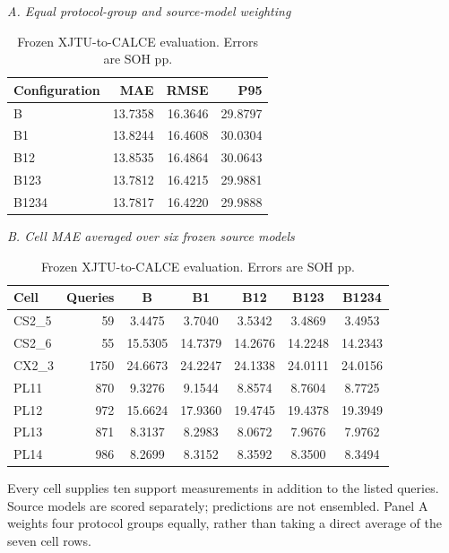 \begin{table}[!p]\renewcommand{\arraystretch}{1.15}\centering
\caption{Frozen XJTU-to-CALCE evaluation. Errors are SOH pp.}\label{tab:calcemain}
\papertablesize\setlength{\tabcolsep}{3pt}
\textit{A. Equal protocol-group and source-model weighting}\\[4pt]
\begin{tabular}{lrrr}
\toprule
Configuration & MAE & RMSE & P95 \\
\midrule
B & 13.7358 & 16.3646 & 29.8797 \\
B1 & 13.8244 & 16.4608 & 30.0304 \\
B12 & 13.8535 & 16.4864 & 30.0643 \\
B123 & 13.7812 & 16.4215 & 29.9881 \\
B1234 & 13.7817 & 16.4220 & 29.9888 \\
\bottomrule
\end{tabular}
\par\medskip
\textit{B. Cell MAE averaged over six frozen source models}\\[4pt]
\begin{tabular}{lrccccc}
\toprule
Cell & Queries & B & B1 & B12 & B123 & B1234 \\
\midrule
CS2\_5 & 59 & 3.4475 & 3.7040 & 3.5342 & 3.4869 & 3.4953 \\
CS2\_6 & 55 & 15.5305 & 14.7379 & 14.2676 & 14.2248 & 14.2343 \\
CX2\_3 & 1750 & 24.6673 & 24.2247 & 24.1338 & 24.0111 & 24.0156 \\
PL11 & 870 & 9.3276 & 9.1544 & 8.8574 & 8.7604 & 8.7725 \\
PL12 & 972 & 15.6624 & 17.9360 & 19.4745 & 19.4378 & 19.3949 \\
PL13 & 871 & 8.3137 & 8.2983 & 8.0672 & 7.9676 & 7.9762 \\
PL14 & 986 & 8.2699 & 8.3152 & 8.3592 & 8.3500 & 8.3494 \\
\bottomrule
\end{tabular}
\par\smallskip\begin{minipage}{\columnwidth}\papertablesize Every cell supplies ten support measurements in addition to the listed queries. Source models are scored separately; predictions are not ensembled. Panel A weights four protocol groups equally, rather than taking a direct average of the seven cell rows.\end{minipage}
\par\vspace{16pt}

\end{table}

